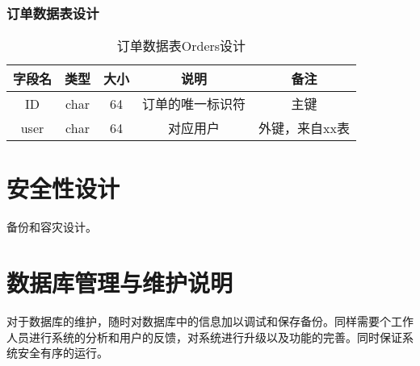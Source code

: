 \subsubsection{订单数据表设计}
\begin{table}[htbp]
\centering
\caption{订单数据表Orders设计} \label{tab:order-database}
\begin{tabular}{|c|c|c|c|c|}
    \hline
    字段名 & 类型 & 大小 & 说明 & 备注 \\
    \hline
    ID & char & 64 & 订单的唯一标识符 & 主键\\
    \hline
    user & char & 64 & 对应用户 & 外键，来自xx表 \\
    \hline
\end{tabular}
\end{table}
\section{安全性设计}
备份和容灾设计。

\section{数据库管理与维护说明}
对于数据库的维护，随时对数据库中的信息加以调试和保存备份。同样需要个工作人员进行系统的分析和用户的反馈，对系统进行升级以及功能的完善。同时保证系统安全有序的运行。